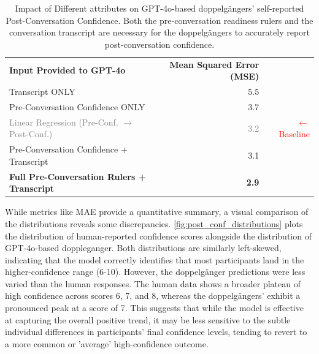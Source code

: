 \begin{table}[ht!]
\centering

\begin{tabular}{@{}lrr@{}}
\cmidrule(r){1-2}
\textbf{Input Provided to GPT-4o} & \textbf{Mean Squared Error (MSE)} & \\
\cmidrule(r){1-2}
Transcript ONLY & 5.5 & \\
Pre-Conversation Confidence ONLY & 3.7 & \\
\textcolor{gray}{Linear Regression (Pre-Conf. $\rightarrow$ Post-Conf.)} & \textcolor{gray}{ 3.2} & \textcolor{red}{\small $\leftarrow$ Baseline} \\
Pre-Conversation Confidence + Transcript & 3.1 & \\
\textbf{Full Pre-Conversation Rulers + Transcript} & \textbf{2.9} & \\
\cmidrule(r){1-2}
\end{tabular}
\caption[Ablation Study on doppelgängers' self-reported post-conversation confidence]{Impact of Different attributes on GPT-4o-based doppelgängers' self-reported Post-Conversation Confidence. Both the pre-conversation readiness rulers and the conversation transcript are necessary for the doppelgängers to accurately report post-conversation confidence.}
\label{tab:ablation_results}
\end{table}



While metrics like MAE provide a quantitative summary, a visual comparison of the distributions reveals some discrepancies. \cref{fig:post_conf_distributions} plots the distribution of human-reported confidence scores alongside the distribution of GPT-4o-based doppleganger. Both distributions are similarly left-skewed, indicating that the model correctly identifies that most participants land in the higher-confidence range (6-10). However, the doppelgänger predictions were less varied than the human responses. The human data shows a broader plateau of high confidence across scores 6, 7, and 8, whereas the doppelgängers' exhibit a pronounced peak at a score of 7. This suggests that while the model is effective at capturing the overall positive trend, it may be less sensitive to the subtle individual differences in participants' final confidence levels, tending to revert to a more common or 'average' high-confidence outcome.



